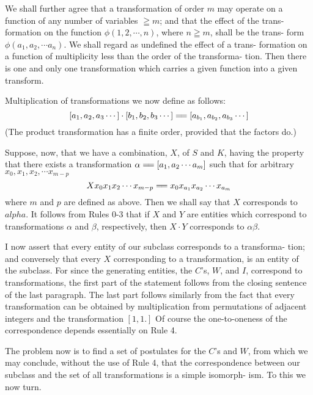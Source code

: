 \documentclass[10pt, twoside]{extarticle}
\newcommand{\td}[2][] {\todo[tickmarkheight=3pt, inline, size=\tiny, #1]{#2}}
\newcommand\longeq{=\joinrel=}
\theoremstyle{breaktheorem}
\theoremstyle{mylemma}
\theoremstyle{mydefinition}
\theoremstyle{mycorollary}
\begin{document}
We shall further agree that a transformation of order \(m\) may operate on
a function of any number of variables \(\geqq m\); and that the effect of the trans-
formation on the function \(\phi(1, 2, \cdots, n)\), where \(n \geqq m\), shall be the trans-
form \(\phi(a_1, a_2, \cdots a_n)\). We shall regard as undefined the effect of a trans-
formation on a function of multiplicity less than the order of the transforma-
tion. Then there is one and only one transformation which carries a given
function into a given transform.

Multiplication of transformations we now define as follows:
\begin{equation}
  \label{eq:multiplication_transformations}
[a_1, a_2, a_3 \cdots] \cdot [b_1, b_2, b_3 \cdots] \longeq [a_{b_1}, a_{b_2}, a_{b_3} \cdots]
\end{equation}
(The product transformation has a finite order, provided that the factors do.)

Suppose, now, that we have a combination, \(X\), of \(S\) and \(K\), having the
property that there exists a transformation\td{check alpha boldness/non-italic} \(\alpha \longeq [a_1, a_2 \cdots a_m]\) such that for
arbitrary \(x_0, x_1, x_2, \cdots x_{m-p}\)
\[Xx_0 x_1 x_2 \cdots x_{m-p} \longeq x_0 x_{a_1}x_{a_2} \cdots x_{a_m}\]
where \(m\) and \(p\) are defined as above. Then we shall say that \(X\) corresponds to
\(alpha\). It follows from Rules 0-3 that if \(X\) and \(Y\) are entities which correspond to
transformations \(\alpha\) and \(\beta\), respectively, then \(X \cdot Y\) corresponds to \(\alpha\beta\).

I now assert that every entity of our subclass corresponds to a transforma-
tion; and conversely that every \(X\) corresponding to a transformation, is an
entity of the subclass. For since the generating entities, the \(C\)'s, \(W\), and \(I\),
correspond to transformations, the first part of the statement follows from the
closing sentence of the last paragraph. The last part follows similarly from
the fact that every transformation can be obtained by multiplication from
permutations of adjacent integers and the transformation \([1, 1.]\) Of course
the one-to-oneness of the correspondence depends essentially on Rule 4.

The problem now is to find a set of postulates for the \(C\)'s and \(W\), from
which we may conclude, without the use of Rule 4, that the correspondence
between our subclass and the set of all transformations is a simple isomorph-
ism. To this we now turn.
\end{document}
